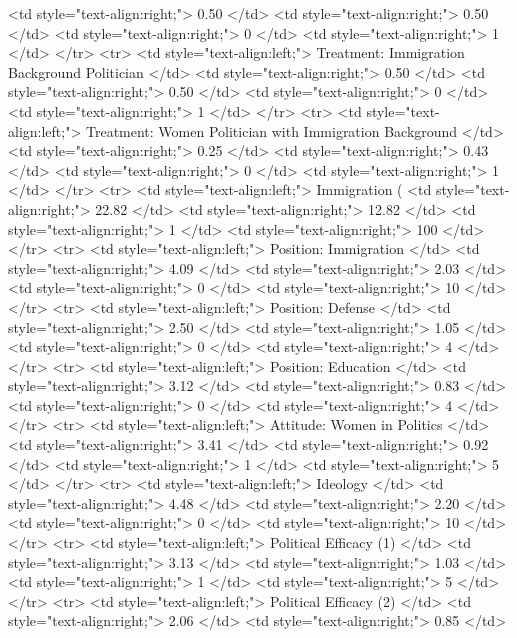    <td style="text-align:right;"> 0.50 </td>
   <td style="text-align:right;"> 0.50 </td>
   <td style="text-align:right;"> 0 </td>
   <td style="text-align:right;"> 1 </td>
  </tr>
  <tr>
   <td style="text-align:left;"> Treatment: Immigration Background Politician </td>
   <td style="text-align:right;"> 0.50 </td>
   <td style="text-align:right;"> 0.50 </td>
   <td style="text-align:right;"> 0 </td>
   <td style="text-align:right;"> 1 </td>
  </tr>
  <tr>
   <td style="text-align:left;"> Treatment: Women Politician with Immigration Background </td>
   <td style="text-align:right;"> 0.25 </td>
   <td style="text-align:right;"> 0.43 </td>
   <td style="text-align:right;"> 0 </td>
   <td style="text-align:right;"> 1 </td>
  </tr>
  <tr>
   <td style="text-align:left;"> Immigration (%
   <td style="text-align:right;"> 22.82 </td>
   <td style="text-align:right;"> 12.82 </td>
   <td style="text-align:right;"> 1 </td>
   <td style="text-align:right;"> 100 </td>
  </tr>
  <tr>
   <td style="text-align:left;"> Position: Immigration </td>
   <td style="text-align:right;"> 4.09 </td>
   <td style="text-align:right;"> 2.03 </td>
   <td style="text-align:right;"> 0 </td>
   <td style="text-align:right;"> 10 </td>
  </tr>
  <tr>
   <td style="text-align:left;"> Position: Defense </td>
   <td style="text-align:right;"> 2.50 </td>
   <td style="text-align:right;"> 1.05 </td>
   <td style="text-align:right;"> 0 </td>
   <td style="text-align:right;"> 4 </td>
  </tr>
  <tr>
   <td style="text-align:left;"> Position: Education </td>
   <td style="text-align:right;"> 3.12 </td>
   <td style="text-align:right;"> 0.83 </td>
   <td style="text-align:right;"> 0 </td>
   <td style="text-align:right;"> 4 </td>
  </tr>
  <tr>
   <td style="text-align:left;"> Attitude: Women in Politics </td>
   <td style="text-align:right;"> 3.41 </td>
   <td style="text-align:right;"> 0.92 </td>
   <td style="text-align:right;"> 1 </td>
   <td style="text-align:right;"> 5 </td>
  </tr>
  <tr>
   <td style="text-align:left;"> Ideology </td>
   <td style="text-align:right;"> 4.48 </td>
   <td style="text-align:right;"> 2.20 </td>
   <td style="text-align:right;"> 0 </td>
   <td style="text-align:right;"> 10 </td>
  </tr>
  <tr>
   <td style="text-align:left;"> Political Efficacy (1) </td>
   <td style="text-align:right;"> 3.13 </td>
   <td style="text-align:right;"> 1.03 </td>
   <td style="text-align:right;"> 1 </td>
   <td style="text-align:right;"> 5 </td>
  </tr>
  <tr>
   <td style="text-align:left;"> Political Efficacy (2) </td>
   <td style="text-align:right;"> 2.06 </td>
   <td style="text-align:right;"> 0.85 </td>

